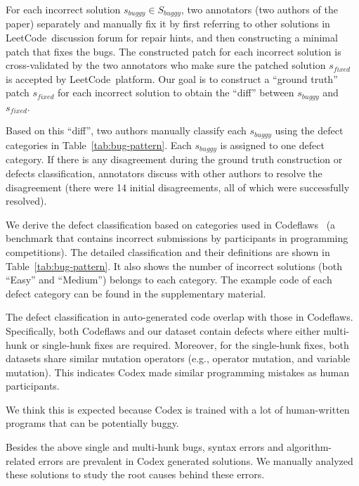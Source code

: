 For each incorrect solution $s_{buggy} \in S_{buggy}$, two annotators (two authors of the paper) separately and manually fix it by first referring to other solutions in LeetCode~discussion forum for repair hints, and then constructing a minimal patch that fixes the bugs. The constructed patch for each incorrect solution is cross-validated by the two annotators who make sure the patched solution $s_{fixed}$ is accepted by LeetCode~platform. Our goal is to construct a ``ground truth'' patch $s_{fixed}$ for each incorrect solution to obtain  the ``diff'' between $s_{buggy}$ and $s_{fixed}$. 

Based on this ``diff'', two authors manually classify each $s_{buggy}$ using the defect categories in Table~\ref{tab:bug-pattern}.
Each $s_{buggy}$ is assigned to one defect category. If there is any disagreement during the ground truth construction or defects classification, annotators discuss with other authors to resolve the disagreement (there were 14 initial disagreements, all of which were successfully resolved).

We derive the defect classification based on categories used in Codeflaws~\cite{tan2017codeflaws} (a benchmark that contains incorrect submissions by participants in programming competitions). The detailed classification and their definitions are shown in Table~\ref{tab:bug-pattern}.
It also shows the number of incorrect solutions (both ``Easy'' and ``Medium'') belongs to each category. The example code of each defect category can be found in the supplementary material.

The defect classification in auto-generated code overlap with those in Codeflaws. Specifically, both Codeflaws and our dataset contain defects where either multi-hunk or single-hunk fixes are required. Moreover, for the single-hunk fixes, both datasets share similar mutation operators (e.g., operator mutation, and variable mutation). This indicates Codex made similar programming mistakes as human participants. 

We think this is expected because Codex is trained with a lot of human-written programs that can be potentially buggy.

Besides the above single and multi-hunk bugs, syntax errors and algorithm-related errors are prevalent in Codex generated solutions. We manually analyzed these solutions to study the root causes behind these errors. 

